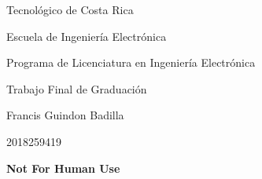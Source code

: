\documentclass[12pt,oneside]{book}
\begin{document}
 \graphicspath{{./}{../tesis/fig/}}
  Tecnológico de Costa Rica
  \par\vspace{1mm}
  Escuela de Ingeniería Electrónica
  \par\vspace{1mm}
  Programa de Licenciatura en Ingeniería Electrónica
  \par\vspace{10mm}
  Trabajo Final de Graduación
  \par\vspace{1mm}
  Francis Guindon Badilla
  \par\vspace{1mm}
  2018259419
  \par\vspace{10mm}
  \textbf{Not For Human Use}
  \par\vspace{10mm}
\end{document}
